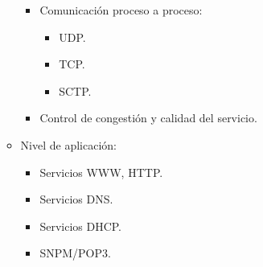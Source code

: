 \begin{itemize}
\begin{itemize}
\begin{itemize}
			            \item Comunicación proceso a proceso:
			                  \begin{itemize}
				                  \item UDP.
				                  \item TCP.
				                  \item SCTP.
			                  \end{itemize}
			            \item Control de congestión y calidad del servicio.
		            \end{itemize}
		      \item Nivel de aplicación:
		            \begin{itemize}
			            \item Servicios WWW, HTTP.
			            \item Servicios DNS.
			            \item Servicios DHCP.
			            \item SNPM/POP3.
		            \end{itemize}
	      \end{itemize}
\end{itemize}\vspace{0.5cm}